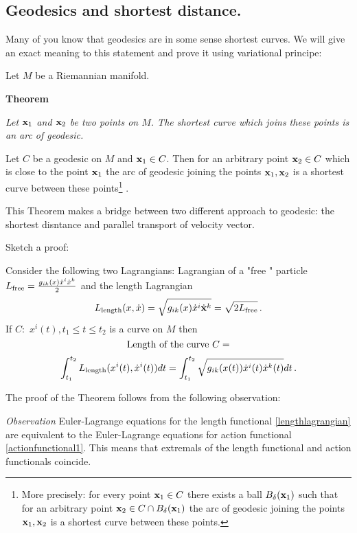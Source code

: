 \documentclass[12pt]{article}
\theoremstyle{theorem}
\numberwithin{equation}{section}
\begin{document}
{\subsection {Geodesics and shortest distance.}

 Many of you know that geodesics are in some sense shortest curves.
 We will give an exact meaning to this statement and prove it using variational principe:

Let $M$ be a Riemannian manifold.

{\bf Theorem}
{\it Let ${\bf x}_1$ and ${\bf x}_2$ be two points on $M$.
The shortest curve which joins these points is an arc of geodesic.

Let $C$ be a geodesic on $M$ and  ${\bf x}_1\in C$. Then for an arbitrary point  ${\bf x}_2\in C$ which is
close to the point ${\bf x}_1$ the arc of geodesic joining the points ${\bf x}_1,{\bf x}_2$ is a shortest curve between
these points\footnote{More precisely: for every point ${\bf x}_1\in C$ there exists a ball $B_{\delta}({\bf x}_1)$
such that for an arbitrary point ${\bf x}_2\in C\cap B_{\delta}({\bf x}_1)$
the arc of geodesic joining the points ${\bf x}_1,{\bf x}_2$ is a shortest curve between
these points.}
.}

\m

  This Theorem makes a bridge between two different approach to geodesic: the shortest disntance and
  parallel transport of velocity vector.

\m

Sketch a proof:


Consider the following two Lagrangians: Lagrangian of a "free "
particle $L_{\rm free}={g_{ik}(x)\dot x^i\dot x^k\over 2}$
and the length Lagrangian
         $$
      L_{\rm length}(x,\dot x)=\sqrt{g_{ik}(x)\dot x^i\dot {{\bf x}}^k}=\sqrt {2L_{\rm free}}\,.
         $$
   If $C\colon \,\,x^i(t), t_1\leq t\leq t_2$ is a curve on $M$ then
                  $$
             \hbox{Length of the curve $C$}=
                  $$
    \begin{equation}\label{lengthlagrangian}
    \int_{t_1}^{t_2}L_{\rm length}(x^i(t),\dot x^i(t))dt=
    \int_{t_1}^{t_2}\sqrt{g_{ik}(x(t))\dot x^i(t)\dot x^k(t)}dt\,.
    \end{equation}


    The proof of the Theorem follows from the following observation:

 {\it Observation}  Euler-Lagrange equations for the length  functional \eqref{lengthlagrangian}
 are equivalent to the  Euler-Lagrange equations for action functional \eqref{actionfunctional1}.
        This means that extremals of the length functional and action functionals coincide.

}
\end{document}
